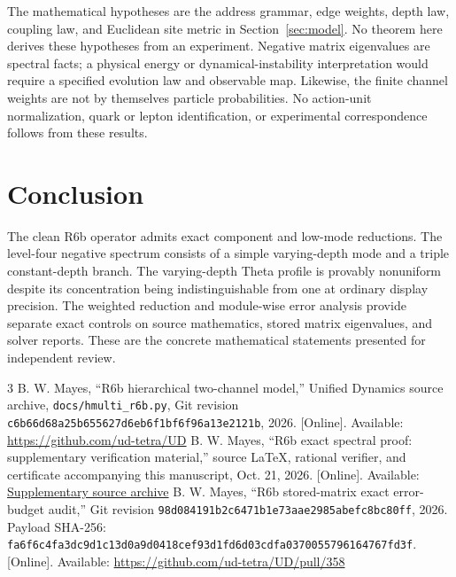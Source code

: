 \documentclass[journal,a4paper,10pt]{IEEEtran}
\theoremstyle{definition}\newtheorem{definition}[theorem]{Definition}
\theoremstyle{remark}\newtheorem{remark}[theorem]{Remark}
\begin{document}
The mathematical hypotheses are the address grammar, edge weights, depth law, coupling law, and Euclidean site metric in Section~\ref{sec:model}. No theorem here derives these hypotheses from an experiment. Negative matrix eigenvalues are spectral facts; a physical energy or dynamical-instability interpretation would require a specified evolution law and observable map. Likewise, the finite channel weights are not by themselves particle probabilities. No action-unit normalization, quark or lepton identification, or experimental correspondence follows from these results.

\section{Conclusion}
The clean R6b operator admits exact component and low-mode reductions. The level-four negative spectrum consists of a simple varying-depth mode and a triple constant-depth branch. The varying-depth Theta profile is provably nonuniform despite its concentration being indistinguishable from one at ordinary display precision. The weighted reduction and module-wise error analysis provide separate exact controls on source mathematics, stored matrix eigenvalues, and solver reports. These are the concrete mathematical statements presented for independent review.

\begin{thebibliography}{3}
 B. W. Mayes, ``R6b hierarchical two-channel model,'' Unified Dynamics source archive, \texttt{docs/hmulti\_r6b.py}, Git revision \nolinkurl{c6b66d68a25b655627d6eb6f1bf6f96a13e2121b}, 2026. [Online]. Available: \url{https://github.com/ud-tetra/UD}
 B. W. Mayes, ``R6b exact spectral proof: supplementary verification material,'' source \LaTeX, rational verifier, and certificate accompanying this manuscript, Oct. 21, 2026. [Online]. Available: \href{https://github.com/ud-tetra/UD/tree/contrib/codex/2026-10-21-r6b-proof-ieee-98b1ad6e/captures/2026-10-21T224330Z-codex-r6b-proof-ieee-98b1ad6e}{Supplementary source archive}
 B. W. Mayes, ``R6b stored-matrix exact error-budget audit,'' Git revision \nolinkurl{98d084191b2c6471b1e73aae2985abefc8bc80ff}, 2026. Payload SHA-256: \nolinkurl{fa6f6c4fa3dc9d1c13d0a9d0418cef93d1fd6d03cdfa0370055796164767fd3f}. [Online]. Available: \url{https://github.com/ud-tetra/UD/pull/358}
\end{thebibliography}
\end{document}
